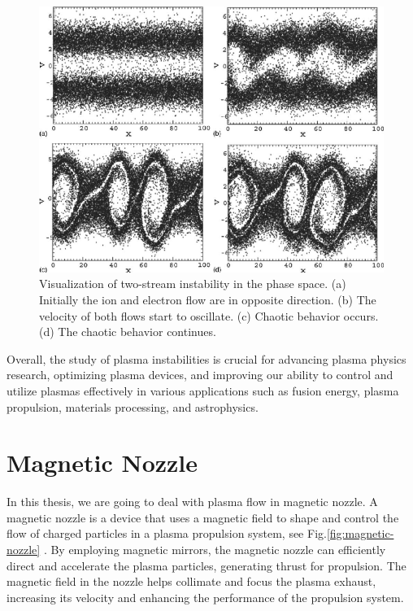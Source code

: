 \begin{figure}[H]
	\centering
	\includegraphics[width=0.7\linewidth]{img/two-stream-instability}
	\caption{Visualization of two-stream instability in the phase space. (a) Initially the ion and electron flow are in opposite direction. (b) The velocity of both flows start to oscillate. (c) Chaotic behavior occurs. (d) The chaotic behavior continues. \cite{ha_nonlinear_2011}}
	\label{fig:two-stream-instability}
\end{figure}


Overall, the study of plasma instabilities is crucial for advancing plasma physics research, optimizing plasma devices, and improving our ability to control and utilize plasmas effectively in various applications such as fusion energy, plasma propulsion, materials processing, and astrophysics.

\section{Magnetic Nozzle}
In this thesis, we are going to deal with plasma flow in magnetic nozzle.
A magnetic nozzle is a device that uses a magnetic field to shape and control the flow of charged particles in a plasma propulsion system, see Fig.\ref{fig:magnetic-nozzle} . By employing magnetic mirrors, the magnetic nozzle can efficiently direct and accelerate the plasma particles, generating thrust for propulsion. The magnetic field in the nozzle helps collimate and focus the plasma exhaust, increasing its velocity and enhancing the performance of the propulsion system.

